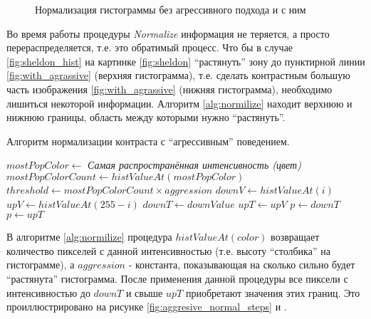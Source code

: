 \documentclass[12pt]{report}
\begin{document}
\begin{figure}[h]
	\centering
	\caption{Нормализация гистограммы без агрессивного подхода  и с ним }
	\label{fig:aggresive_normal}
\end{figure}

Во время работы процедуры \textit{Normalize} информация не теряется, а просто перераспределяется, т.е. это 
обратимый 
процесс. Что бы в случае \ref{fig:sheldon_hist} на картинке \ref{fig:sheldon} ``растянуть'' зону до пунктирной 
линии 
\ref{fig:with_agrassive} (верхняя гистограмма), т.е. сделать контрастным 
большую часть изображения \ref{fig:with_agrassive} (нижняя гистограмма), необходимо лишиться некоторой информации. 
Алгоритм \ref{alg:normilize} находит верхнюю и нижнюю границы, область между которыми нужно ``растянуть''.

\begin{algorithm}
\caption{Алгоритм нормализации контраста с ``агрессивным'' поведением.}
\label{alg:normilize}

\begin{algorithmic}[1]
\STATE $mostPopColor\gets $ \emph{Самая распространённая интенсивность (цвет)}
\STATE $mostPopColorCount\gets histValueAt(mostPopColor)$ 
\STATE $threshold\gets mostPopColorCount\times{aggression}$
\STATE $downV\gets histValueAt(i)$
\STATE $upV\gets histValueAt(255-i)$
\STATE $downT\gets downValue$
\ENDIF
{}
\STATE $upT\gets upV$
\ENDIF
\ENDFOR
{} 
\STATE $p\gets downT$
\STATE $p\gets upT$	
\ENDIF
\ENDFOR
\end{algorithmic}

\end{algorithm}

В алгоритме \ref{alg:normilize} процедура $histValueAt(color)$ возвращает количество пикселей с данной интенсивностью (т.е. высоту 
``столбика'' 
на гистограмме), а $aggression$ - константа, показывающая на сколько сильно будет ``растянута'' гистограмма. После 
применения данной процедуры все пиксели с интенсивностью до $downT$ и свыше $upT$ приобретают значения этих границ. 
Это проиллюстрировано на рисунке \ref{fig:aggresive_normal_steps}  и .
\end{document}
